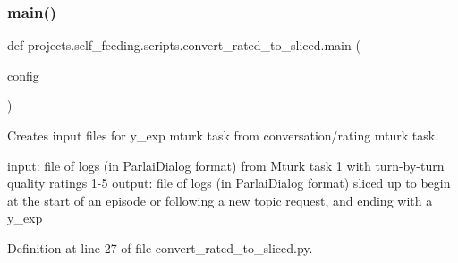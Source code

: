 \subsubsection{\texorpdfstring{main()}{main()}}
{\footnotesize\ttfamily def projects.\+self\+\_\+feeding.\+scripts.\+convert\+\_\+rated\+\_\+to\+\_\+sliced.\+main (\begin{DoxyParamCaption}\item[{}]{config }\end{DoxyParamCaption})}

\begin{DoxyVerb}Creates input files for y_exp mturk task from conversation/rating mturk task.

input: file of logs (in ParlaiDialog format) from Mturk task 1 with turn-by-turn
    quality ratings 1-5
output: file of logs (in ParlaiDialog format) sliced up to begin at the start of
    an episode or following a new topic request, and ending with a y_exp
\end{DoxyVerb}
 

Definition at line 27 of file convert\+\_\+rated\+\_\+to\+\_\+sliced.\+py.


